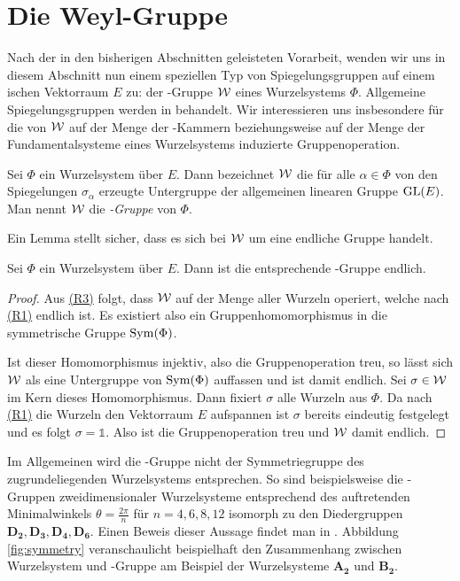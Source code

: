 \newpage
\section{Die Weyl-Gruppe}
\label{sec:weylgroup}

Nach der in den bisherigen Abschnitten geleisteten Vorarbeit, wenden wir uns in diesem Abschnitt nun einem speziellen Typ von Spiegelungsgruppen auf einem \euklid ischen Vektorraum $E$ zu: der \weyl\hyp{}Gruppe $\mathcal{W}$ eines Wurzelsystems $\Phi$. 
Allgemeine Spiegelungsgruppen werden in \cite{humphreys1992reflection} behandelt.
Wir interessieren uns insbesondere für die von $\mathcal{W}$ auf der Menge der \weyl\hyp{}Kammern beziehungsweise auf der Menge der Fundamentalsysteme eines Wurzelsystems induzierte Gruppenoperation.

\begin{defn}
  \label{def:weylgroup}
  Sei $\Phi$ ein Wurzelsystem über $E$. 
  Dann bezeichnet $\mathcal{W}$ die für alle $\alpha \in \Phi$ von den Spiegelungen $\sigma_\alpha$ erzeugte Untergruppe der allgemeinen linearen Gruppe $\operatorname{GL}(E)$. 
  Man nennt $\mathcal{W}$ die \emph{\weyl\hyp{}Gruppe} von $\Phi$.
\end{defn}

Ein Lemma stellt sicher, dass es sich bei $\mathcal{W}$ um eine endliche Gruppe handelt.

\begin{lem}
  \label{lem:weylFinite}
  Sei $\Phi$ ein Wurzelsystem über $E$. Dann ist die entsprechende \weyl\hyp{}Gruppe endlich. 
\end{lem}

\begin{proof}
  Aus \hyperref[it:R3]{(R3)} folgt, dass $\mathcal{W}$ auf der Menge aller Wurzeln operiert, welche nach \hyperref[it:R1]{(R1)} endlich ist.
  Es existiert also ein Gruppenhomomorphismus in die symmetrische Gruppe $\operatorname{Sym}(\Phi)$.

  Ist dieser Homomorphismus injektiv, also die Gruppenoperation treu, so lässt sich $\mathcal{W}$ als eine Untergruppe von $\operatorname{Sym}(\Phi)$ auffassen und ist damit endlich.
  Sei $\sigma \in \mathcal{W}$ im Kern dieses Homomorphismus.
  Dann fixiert $\sigma$ alle Wurzeln aus $\Phi$.
  Da nach \hyperref[it:R1]{(R1)} die Wurzeln den Vektorraum $E$ aufspannen ist $\sigma$ bereits eindeutig festgelegt und es folgt $\sigma = \mathds{1}$.
  Also ist die Gruppenoperation treu und $\mathcal{W}$ damit endlich.
\end{proof}

\begin{bem}
  Im Allgemeinen wird die \weyl\hyp{}Gruppe nicht der Symmetriegruppe des zugrundeliegenden Wurzelsystems entsprechen.
  So sind beispielsweise die \weyl\hyp{}Gruppen zweidimensionaler Wurzelsysteme entsprechend des auftretenden Minimalwinkels $\theta = \tfrac{2\pi}{n}$ für $n = 4,6,8,12$ isomorph zu den Diedergruppen $\mathbf{D_2}, \mathbf{D_3}, \mathbf{D_4}, \mathbf{D_6}$.
  Einen Beweis dieser Aussage findet man in \cite[S.203f.]{hall2015lie}.
  Abbildung \ref{fig:symmetry} veranschaulicht beispielhaft den Zusammenhang zwischen Wurzelsystem und \weyl\hyp{}Gruppe am Beispiel der Wurzelsysteme $\mathbf{A_2}$ und $\mathbf{B_2}$.
\end{bem}

